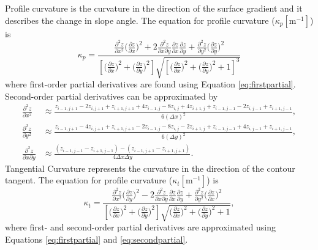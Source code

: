 \documentclass{sfuthesis}
\begin{document}
Profile curvature is the curvature in the direction of the surface gradient and it describes the change in slope angle. The equation for profile curvature ($\kappa_p \left[\mathrm{m}^{-1}\right]$) is \citep{Neteler2008}
\begin{equation} 
\kappa_p = \frac{\frac{\partial^2 z}{\partial x^2} \big(\frac{\partial z}{\partial x}\big)^2 + 2\frac{\partial^2 z}{\partial x \partial y}\frac{\partial z}{\partial x}\frac{\partial z}{\partial y} +  \frac{\partial^2 z}{\partial y^2} \big(\frac{\partial z}{\partial y}\big)^2}{\left[\big( \frac{\partial z}{\partial x} \big) ^2 + \big(\frac{\partial z}{\partial y} \big)^2\right] \sqrt{\left[\big(\frac{\partial z}{\partial x} \big) ^2 + \big( \frac{\partial z}{\partial y}\big) ^2+1\right]^3}}
\end{equation} 
where first-order partial derivatives are found using Equation \ref{eq:firstpartial}. Second-order partial derivatives can be approximated by \citep{Hofierka2009, Neteler2008}
\begin{align}\label{eq:secondpartial}
\frac{\partial^2 z}{\partial x^2} &\approx\frac{z_{i-1,j+1}-2z_{i,j+1}+z_{i+1,j+1}+4z_{i-1,j}-8z_{i,j}+4z_{i+1,j}+z_{i-1,j-1}-2z_{i,j-1}+z_{i+1,j-1}}{6  (\Delta x)^2},\nonumber\\
\frac{\partial^2 z}{\partial y^2} &\approx \frac{z_{i-1,j+1}-4z_{i,j+1}+z_{i+1,j+1}-2z_{i-1,j}-8z_{i,j}-2z_{i+1,j}+z_{i-1,j-1}+4z_{i,j-1}+z_{i+1,j-1}}{6  (\Delta y)^2},\nonumber\\
\frac{\partial^2 z}{\partial x \partial y} &\approx \frac{(z_{i-1,j-1}-z_{i+1,j-1})-(z_{i-1,j+1}-z_{i+1,j+1})}{4  \Delta x \Delta y}.
\end{align}
Tangential Curvature represents the curvature in the direction of the contour tangent. The equation for profile curvature ($\kappa_t \left[\mathrm{m}^{-1}\right]$) is \citep{Neteler2008}
\begin{equation}
\kappa_t = \frac{\frac{\partial^2 z}{\partial x^2} \big(\frac{\partial z}{\partial y}\big)^2 - 2\frac{\partial^2 z}{\partial x \partial y}\frac{\partial z}{\partial x}\frac{\partial z}{\partial y} +  \frac{\partial^2 z}{\partial y^2} \big(\frac{\partial z}{\partial x}\big)^2}{\left[\big( \frac{\partial z}{\partial x} \big) ^2 + \big(\frac{\partial z}{\partial y} \big)^2\right] \sqrt{\big(\frac{\partial z}{\partial x} \big) ^2 + \big( \frac{\partial z}{\partial y}\big) ^2 +1}},
\end{equation} 	
where first- and second-order partial derivatives are approximated using Equations \ref{eq:firstpartial} and \ref{eq:secondpartial}. 
\end{document}
